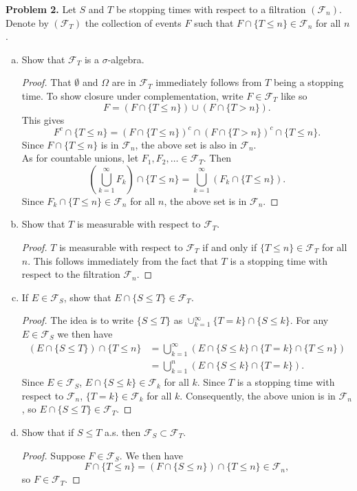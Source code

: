 \documentclass[11pt,letterpaper]{report}
\newcommand{\mcal}[1]{\mathcal{#1}}
\begin{document}
\noindent\textbf{Problem 2. }
Let $S$ and $T$ be stopping times with respect to a filtration $(\mcal{F}_n)$. Denote by $(\mcal{F}_T)$ the collection of events $F$ such that $F\cap \{T\leq n\} \in \mcal{F}_n$ for all $n$.
\begin{enumerate}[(a)]
	\item Show that $\mcal{F}_T$ is a $\sigma$-algebra.
	\begin{proof}
		That $\emptyset$ and $\Omega$ are in $\mcal{F}_T$ immediately follows from $T$ being a stopping time. To show closure under complementation, write $F\in \mcal{F}_T$ like so
		\[
		F = (F\cap \{T\leq n\})\cup (F\cap \{T>n\}).
		\]
		This gives
		\[
		F^c\cap \{T\leq n\} = (F\cap \{T\leq n\})^c\cap (F\cap \{T>n\})^c\cap \{T\leq n\}.
		\]
		Since $F\cap \{T\leq n\}$ is in $\mcal{F}_n$, the above set is also in $\mcal{F}_n$.\\

		\noindent As for countable unions, let $F_1, F_2, \ldots \in \mcal{F}_T$. Then
		\[
		\left(\bigcup_{k=1}^\infty F_k\right)\cap \{T\leq n\} = \bigcup_{k=1}^\infty (F_k\cap \{T\leq n\}).
		\]
		Since $F_k\cap \{T\leq n\}\in \mcal{F}_n$ for all $n$, the above set is in $\mcal{F}_n$.
	\end{proof}

	\item Show that $T$ is measurable with respect to $\mcal{F}_T$.
	\begin{proof}
		$T$ is measurable with respect to $\mcal{F}_T$ if and only if $\{T\leq n\}\in \mcal{F}_T$ for all $n$. This follows immediately from the fact that $T$ is a stopping time with respect to the filtration $\mcal{F}_n$. 
	\end{proof}

	\item If $E\in \mcal{F}_S$, show that $E\cap \{S\leq T\}\in \mcal{F}_T$.
	\begin{proof}
		The idea is to write $\{S\leq T\}$ as $\cup_{k=1}^\infty \{T = k\}\cap \{S\leq k\}$. For any $E\in \mcal{F}_S$ we then have
		\begin{align*}
		(E\cap \{S\leq T\})\cap \{T\leq n\} &= \bigcup_{k=1}^\infty( E\cap \{S\leq k\}\cap \{T = k\}\cap\{T\leq n\} )\\
		&= \bigcup_{k=1}^n(E\cap \{S\leq k\}\cap \{T = k\}).
		\end{align*}
		Since $E\in \mcal{F}_S$, $E\cap \{S\leq k\}\in \mcal{F}_k$ for all $k$. Since $T$ is a stopping time with respect to $\mcal{F}_n$, $\{T = k\}\in \mcal{F}_k$ for all $k$. Consequently, the above union is in $\mcal{F}_n$, so $E\cap \{S\leq T\}\in \mcal{F}_T$.
	\end{proof}

	\item Show that if $S\leq T$ a.s. then $\mcal{F}_S\subset \mcal{F}_T$.
	\begin{proof}
		Suppose $F\in \mcal{F}_S$. We then have
		\[
		F\cap \{T\leq n\} = (F\cap \{S\leq n\})\cap \{T\leq n\} \in \mcal{F}_n,
		\]
		so $F\in \mcal{F}_T$.
	\end{proof}
\end{enumerate}
\end{document}
